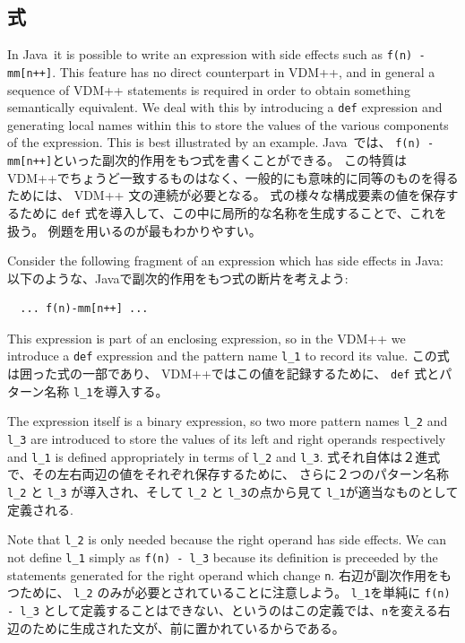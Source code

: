 \documentclass[\pformat,12pt]{jarticle}
\newcommand{\JAVA}{Java}
\begin{document}
\subsection{式}\label{expressions}

In \JAVA\ it is possible to write an expression with side effects such
as \texttt{f(n) - mm[n++]}. This feature has no direct counterpart
in VDM++, and in general a sequence of VDM++ statements is required in
order to obtain something semantically equivalent. We deal with this
by introducing a \texttt{def} expression and generating local names
within this to store the values of the various components of the
expression. This is best illustrated by an example.
 \JAVA\ では、  \texttt{f(n) - mm[n++]}といった副次的作用をもつ式を書くことができる。
この特質は VDM++でちょうど一致するものはなく、一般的にも意味的に同等のものを得るためには、 VDM++ 文の連続が必要となる。
式の様々な構成要素の値を保存するために \texttt{def} 式を導入して、この中に局所的な名称を生成することで、これを扱う。
例題を用いるのが最もわかりやすい。

Consider the following fragment of an expression which has side
effects in Java:
以下のような、Javaで副次的作用をもつ式の断片を考えよう:

\begin{small}
\begin{verbatim}
  ... f(n)-mm[n++] ...
\end{verbatim}
\end{small}

This expression is part of an enclosing expression, so in the VDM++ we
introduce a \texttt{def} expression and the pattern name \texttt{l\_1}
to record its value. 
この式は囲った式の一部であり、 VDM++ではこの値を記録するために、 \texttt{def} 式とパターン名称 \texttt{l\_1}を導入する。

The expression itself is a binary expression, so two more pattern
names \texttt{l\_2} and \texttt{l\_3} are introduced to store the
values of its left and right operands respectively and \texttt{l\_1}
is defined appropriately in terms of \texttt{l\_2} and \texttt{l\_3}. 
式それ自体は２進式で、その左右両辺の値をそれぞれ保存するために、 さらに２つのパターン名称\texttt{l\_2} と \texttt{l\_3} が導入され、そして \texttt{l\_2} と \texttt{l\_3}の点から見て \texttt{l\_1}が適当なものとして定義される. 

Note that \texttt{l\_2} is only needed because
the right operand has side effects. We can not define \texttt{l\_1}
simply as \texttt{f(n) - l\_3} because its definition is preceeded
by the statements generated for the right operand which change \texttt{n}.
右辺が副次作用をもつために、 \texttt{l\_2} のみが必要とされていることに注意しよう。
\texttt{l\_1}を単純に \texttt{f(n) - l\_3} として定義することはできない、というのはこの定義では、\texttt{n}を変える右辺のために生成された文が、前に置かれているからである。
\end{document}
